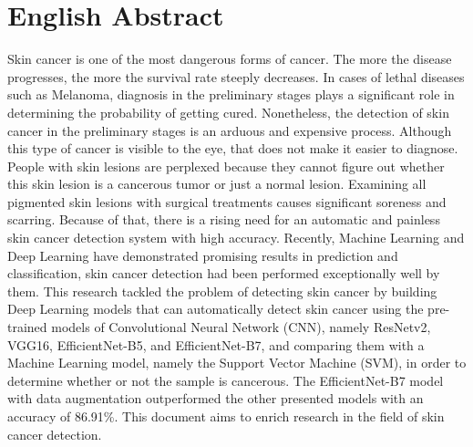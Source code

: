 \documentclass[12pt]{diazessay}
\begin{document}
    \section*{English Abstract}
    \hspace{0.7cm} Skin cancer is one of the most dangerous forms of cancer. The more the disease progresses, the more the survival rate steeply decreases. In cases of lethal diseases such as Melanoma, diagnosis in the preliminary stages plays a significant role in determining the probability of getting cured. Nonetheless, the detection of skin cancer in the preliminary stages is an arduous and expensive process. Although this type of cancer is visible to the eye, that does not make it easier to diagnose. People with skin lesions are perplexed because they cannot figure out whether this skin lesion is a cancerous tumor or just a normal lesion. Examining all pigmented skin lesions with surgical treatments causes significant soreness and scarring. Because of that, there is a rising need for an automatic and painless skin cancer detection system with high accuracy. Recently, Machine Learning and Deep Learning have demonstrated promising results in prediction and classification, skin cancer detection had been performed exceptionally well by them. This research tackled the problem of detecting skin cancer by building Deep Learning models that can automatically detect skin cancer using the pre-trained models of Convolutional Neural Network (CNN), namely ResNetv2, VGG16, EfficientNet-B5, and EfficientNet-B7, and comparing them with a Machine Learning model, namely the Support Vector Machine (SVM), in order to determine whether or not the sample is cancerous. The EfficientNet-B7 model with data augmentation outperformed the other presented models with an accuracy of 86.91\%. This document aims to enrich research in the field of skin cancer detection.

    \newpage
\end{document}
